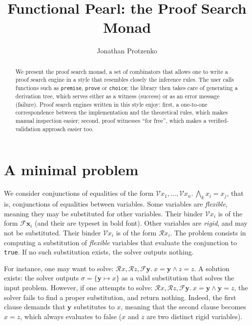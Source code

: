 \documentclass{easychair}
\def\li{\lstinline}
\newcommand{\R}{\ensuremath{\mathcal{R}}} %
\newcommand{\f}[1]{\ensuremath{\mathbf{#1}}} %
\newcommand{\F}{\ensuremath{\mathcal{F}}} %
\newcommand{\V}{\ensuremath{\mathcal{V}}} %
\begin{document}
\title{Functional Pearl: the Proof Search Monad}

\author{Jonathan Protzenko}

\maketitle

\begin{abstract}
  We present the proof search monad, a set of combinators that allows one to
  write a proof search engine in a style that resembles closely the inference
  rules. The user calls functions such as \li+premise+, \li+prove+ or
  \li+choice+; the library then takes care of generating a derivation tree,
  which serves either as a witness (success) or as an error message (failure).
  Proof search engines written in this style enjoy: first, a one-to-one
  correspondence between the implementation and the theoretical rules, which
  makes manual inspection easier; second, proof witnesses ``for free'', which
  makes a verified-validation approach easier too.
\end{abstract}

\section{A minimal problem}

We consider conjunctions of equalities of the form
$\V x_1, \ldots, \V x_n.\ \bigwedge_k x_i = x_j$, that is, conjunctions of
equalities between variables. Some variables are \emph{flexible}, meaning they may be
substituted for other variables. Their binder $\V x_i$ is of the form $\F \f
x_i$ (and their are typeset in bold font). Other variables are \emph{rigid}, and
may not be substituted. Their binder $\V x_i$ is of the form $\R x_i$. The
problem consists in computing a substitution of \emph{flexible} variables that
evaluate the conjunction to \li+true+. If no such substitution exists, the
solver outputs nothing.

For instance, one may want to solve: $\R x, \R z, \F \f y.\ x = \f y \wedge z = z$.
A solution exists: the solver outputs $\sigma = \{ \f y \mapsto x \}$ as a valid
substitution that solves the input problem. However, if one attempts to solve:
$\R x, \R z, \F \f y.\ x = \f y \wedge \f y = z$, the solver fails to find a
proper substitution, and return nothing. Indeed, the first clause demands that
$\f y$ substitutes to $x$, meaning that the second clause becomes $x = z$, which
always evaluates to false ($x$ and $z$ are two distinct rigid variables).
\end{document}
